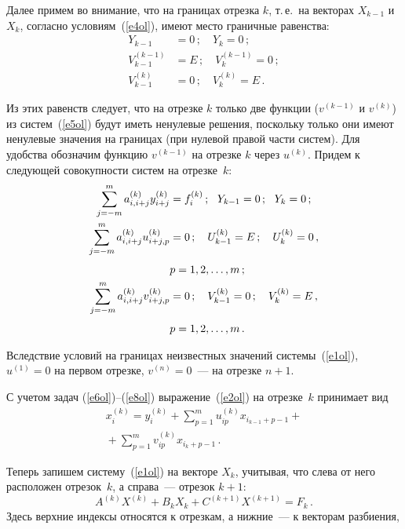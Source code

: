 \begin{multicols}{2}
     Далее примем во внимание, что на границах отрезка $k$, т.\,е.\ на
векторах $X_{k-1}$ и $X_k$, согласно условиям~(\ref{e4ol}), имеют место
граничные равенства:
     \begin{align*}
     Y_{k-1} & =0\,;\quad Y_k=0\,;\\[4pt]
     V_{k-1}^{(k-1)} & =E\,;\quad V_k^{(k-1)} =0\,;\\[4pt]
     V_{k-1}^{(k)} & =0\,;\quad V_k^{(k)} =E\,.
     \end{align*}

     Из этих равенств следует, что на отрезке $k$ только две функции
     ($v^{(k-1)}$ и $v^{(k)}$) из систем~(\ref{e5ol}) будут иметь ненулевые
решения, поскольку только они имеют ненулевые значения на границах (при
нулевой правой части систем). Для удобства обозначим функцию $v^{(k-1)}$ на
отрезке $k$ через $u^{(k)}$. Придем к следующей совокупности систем на
отрезке~$k$:
     \begin{align}
     \sum\limits_{j=-m}^m a^{(k)}_{i,i+j} y^{(k)}_{i+j} & = f_i^{(k)}\,;\ \
Y_{k-1} =0\,;\ \ Y_k=0\,;\label{e6ol}\\
     \sum\limits_{j=-m}^m a^{(k)}_{i,i+j} u_{i+j,p}^{(k)} & = 0\,;\quad
U^{(k)}_{k-1} =E\,;\quad U_k^{(k)} =0\,,\notag\\[-6pt]
&\label{e7ol}\\[-6pt]
& p=1, 2, \ldots , m\,;\notag\\
     \sum\limits_{j=-m}^m a_{i,i+j}^{(k)}v^{(k)}_{i+j, p} & =0\,;\quad
V^{(k)}_{k-1} =0\,;\quad V_k^{(k)} =E\,,\notag\\[-6pt]
&\label{e8ol}\\[-6pt]
&p=1, 2, \ldots , m\,.\notag
     \end{align}

     Вследствие условий на границах неизвестных значений
системы~(\ref{e1ol}), $u^{(1)} = 0$ на первом отрезке, $v^{(n)} = 0$~--- на
отрезке $n + 1$.

     С учетом задач (\ref{e6ol})--(\ref{e8ol}) выражение~(\ref{e2ol}) на
отрезке~$k$ принимает вид
     \begin{multline}
     x_i^{(k)} = y_i^{(k)} +\sum\limits_{p=1}^m u_{ip}^{(k)} x_{i_{k-1}+p-1}+{}\\
{}+\sum\limits_{p=1}^m v_{ip}^{(k)}x_{i_k+p-1}\,.
     \label{e9ol}
     \end{multline}

     Теперь запишем систему~(\ref{e1ol}) на векторе $X_k$, учитывая, что
слева от него расположен отрезок~$k$, а справа~--- отрезок $k + 1$:
     \begin{equation}
     A^{(k)} X^{(k)} +B_k X_k +C^{(k+1)} X^{(k+1)} = F_k\,.
     \label{e10ol}
     \end{equation}
Здесь верхние индексы относятся к отрезкам, а нижние~--- к векторам
разбиения,
\end{multicols}
